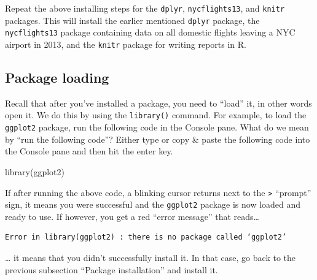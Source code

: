 \documentclass[
  letterpaper,
  DIV=11,
  numbers=noendperiod]{scrreprt}
\newenvironment{Shaded}{\begin{snugshade}}{\end{snugshade}}
\newcommand{\FunctionTok}[1]{\textcolor[rgb]{0.28,0.35,0.67}{#1}}
\newcommand{\NormalTok}[1]{\textcolor[rgb]{0.00,0.23,0.31}{#1}}
\theoremstyle{definition}
\theoremstyle{remark}
\begin{document}
\begin{tcolorbox}[enhanced jigsaw, colback=white, toprule=.15mm, bottomrule=.15mm, titlerule=0mm, title={{🎯} Learning Check 1.1}, leftrule=.75mm, arc=.35mm, left=2mm, colframe=quarto-callout-tip-color-frame, coltitle=black, opacitybacktitle=0.6, bottomtitle=1mm, colbacktitle=quarto-callout-tip-color!10!white, opacityback=0, toptitle=1mm, rightrule=.15mm, breakable]

Repeat the above installing steps for the \texttt{dplyr},
\texttt{nycflights13}, and \texttt{knitr} packages. This will install
the earlier mentioned \texttt{dplyr} package, the \texttt{nycflights13}
package containing data on all domestic flights leaving a NYC airport in
2013, and the \texttt{knitr} package for writing reports in R.

\end{tcolorbox}

\hypertarget{sec-package-loading}{%
\subsection{Package loading}\label{sec-package-loading}}

Recall that after you've installed a package, you need to ``load'' it,
in other words open it. We do this by using the \texttt{library()}
command. For example, to load the \texttt{ggplot2} package, run the
following code in the Console pane. What do we mean by ``run the
following code''? Either type or copy \& paste the following code into
the Console pane and then hit the enter key.

\begin{Shaded}
\begin{Highlighting}[]
\FunctionTok{library}\NormalTok{(ggplot2)}
\end{Highlighting}
\end{Shaded}

If after running the above code, a blinking cursor returns next to the
\texttt{\textgreater{}} ``prompt'' sign, it means you were successful
and the \texttt{ggplot2} package is now loaded and ready to use. If
however, you get a red ``error message'' that reads\ldots{}

\begin{verbatim}
Error in library(ggplot2) : there is no package called ‘ggplot2’
\end{verbatim}

\ldots{} it means that you didn't successfully install it. In that case,
go back to the previous subsection ``Package installation'' and install
it.
\end{document}
